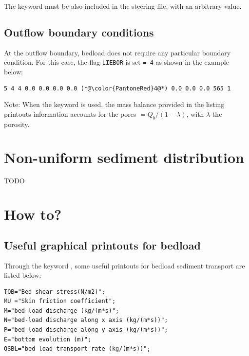 The keyword  must be also included in the steering file, with an arbitrary value.

\subsection{Outflow boundary conditions}
At the outflow boundary, bedload does not require any particular boundary condition.
For this case, the flag \texttt{LIEBOR} is set \texttt{= 4} as shown in the example below:

\begin{lstlisting}[frame=trBL]
5 4 4 0.0 0.0 0.0 0.0 (*@\color{PantoneRed}4@*) 0.0 0.0 0.0 565 1
\end{lstlisting}

\begin{WarningBlock}{Note:}
When the keyword  is used, the mass balance provided in the listing printouts information accounts for the pores $=Q_b/(1-\lambda)$, with $\lambda$ the porosity.
\end{WarningBlock}

\section{Non-uniform sediment distribution}
TODO

\pagebreak
\section{How to?}
\subsection{Useful graphical printouts for bedload}
Through the keyword , some useful printouts for bedload sediment transport are listed below:
\begin{lstlisting}[frame=trBL]
TOB="Bed shear stress(N/m2)";
MU ="Skin friction coefficient";
M="bed-load discharge (kg/(m*s)";
N="bed-load discharge along x axis (kg/(m*s))";
P="bed-load discharge along y axis (kg/(m*s))";
E="bottom evolution (m)";
QSBL="bed load transport rate (kg/(m*s))";
\end{lstlisting}

